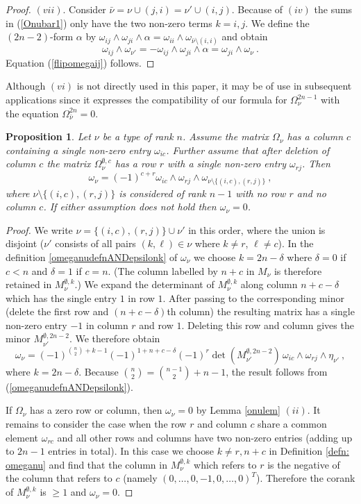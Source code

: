 \documentclass[10pt]{amsart}
\theoremstyle{plain}
\newtheorem{prop}[thm]{Proposition}
\newcommand{\0}{\color{blue}{\mathsf{0}}}
\begin{document}
\begin{proof}
$(vii)$. Consider $\bar\nu=\nu\cup (j,i)=\nu'\cup (i,j)$. Because of $(iv)$ the sums in
(\ref{Onubar1}) only have the two non-zero terms $k=i,j$. We define the $(2n-2)$-form $\alpha$
by $\omega_{ij}\wedge\omega_{ji}\wedge\alpha=\omega_{ii}\wedge\omega_{\bar\nu\setminus (i,i)}$ and obtain
$$
\omega_{ij}\wedge\omega_{\nu'}=-\omega_{ij}\wedge\omega_{ji}\wedge\alpha=
\omega_{ji}\wedge\omega_{\nu} \ .
$$
Equation (\ref{flipomegaij}) follows.
\end{proof}
Although $(vi)$ is not directly used in this paper, it may be of use in subsequent applications since it  expresses the compatibility of our formula for $\Omega^{2n-1}_{\nu}$ with the equation $\Omega_{\bar\nu}^{2n}=0$.

\begin{prop}\label{prop: omegaexpand}
Let $\nu$ be a type of rank $n$.
Assume the matrix $\Omega_\nu$ has a column $c$ containing a single
non-zero entry $\omega_{ic}$.
Further assume that after deletion of column $c$ the matrix $\Omega_\nu^{\emptyset,c}$ has a row $r$ with a single non-zero
entry $\omega_{rj}$. Then
\begin{equation}
\omega_\nu=(-1)^{c+r}\omega_{ic}\wedge\omega_{rj}\wedge\omega_{\nu\setminus\{(i,c),(r,j)\}}\ ,
\end{equation}
where $\nu\setminus\{(i,c),(r,j)\}$ is considered of rank $n-1$ with
no row $r$ and no column $c$.
If either  assumption does not hold  then $\omega_\nu=0$.
\end{prop}
\begin{proof}
We write $\nu=\{(i,c),(r,j)\}\cup\nu'$ in this
order, where  the union is disjoint ($\nu'$ consists of all pairs $(k,\ell) \in \nu$ where $k\neq r$, $\ell \neq c$). 
In the definition \eqref{omeganudefnANDepsilonk} of $\omega_\nu$ we choose $k=2n-\delta$ where $\delta=0$ if $c<n$ and $\delta=1$ if $c=n$. (The column labelled by $n+c$  in $M_{\nu}$ is therefore retained in $M^{\emptyset,k}_\nu$.) We expand the determinant of $M_{\nu}^{\emptyset, k}$ along column  $n+c-\delta$ which has
the single entry $1$ in row $1$. After passing to the corresponding minor (delete the first row and  $(n+c-\delta)$th column) the resulting matrix has a  single non-zero entry $-1$ in column $r$ and row $1$. Deleting this row and column gives the minor $M_{\nu'}^{\emptyset, 2n-2}$.  We therefore  obtain
$$
\omega_\nu=(-1)^{\binom{n}2+k-1} (-1)^{1+n+c-\delta}(-1)^{r}\det(M_{\nu'}^{\emptyset,2n-2})\,\omega_{ic}\wedge\omega_{rj}\wedge\eta_{\nu'}\ ,
$$
where $k=2n-\delta$. Because $\binom{n}2=\binom{n-1}2+n-1$, the result follows from (\ref{omeganudefnANDepsilonk}).


If $\Omega_{\nu}$ has a zero row or column, then $\omega_\nu=0$ by Lemma \ref{onulem} $(ii)$. 
It remains to consider the case when the row $r$ and column $c$ share a common element $\omega_{rc}$ and all other rows and columns have two non-zero
entries (adding up to $2n-1$ entries in total).
In this case we choose $k\neq r,n+c$ in Definition \ref{defn: omeganu} and find
that the column in $M_\nu^{\emptyset,k}$ which refers to $r$ is the negative
of the column that refers to $c$ (namely
$(0,\ldots,0,-1,0,\ldots,0)^T$). Therefore the corank of $M_\nu^{\emptyset,k}$ is $\geq1$
and $\omega_\nu=0$.
\end{proof}
\end{document}
